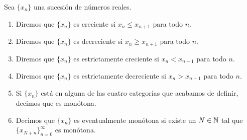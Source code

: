     \begin{definicion}
        Sea $\{x_n\}$ una sucesión de números reales.
    \begin{enumerate}
        \item[a)] Diremos que $\{x_n\}$ es creciente si $x_n \leq x_{n+1}$ para todo $n$.
        \item[b)] Diremos que $\{x_n\}$ es decreciente si $x_n \geq x_{n+1}$ para todo $n$.
        \item[c)] Diremos que $\{x_n\}$ es estrictamente creciente si $x_n < x_{n+1}$ para todo $n$.
        \item[d)] Diremos que $\{x_n\}$ es estrictamente decreciente si $x_n > x_{n+1}$ para todo $n$.
        \item[e)] Si $\{x_n\}$ está en alguna de las cuatro categorías que acabamos de definir, decimos que es monótona.
        \item[f)] Decimos que $\{x_n\}$ es eventualmente monótona si existe un $N \in \mathbb{N}$ tal que $\{x_{N+n}\}_{n=0}^\infty$ es monótona.
    \end{enumerate}
    \end{definicion}
